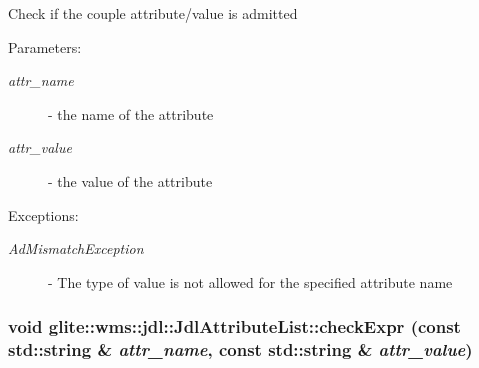 Check if the couple attribute/value is admitted \begin{Desc}
\item[Parameters:]
\begin{description}
\item[{\em attr\_\-name}]- the name of the attribute \item[{\em attr\_\-value}]- the value of the attribute \end{description}
\end{Desc}
\begin{Desc}
\item[Exceptions:]
\begin{description}
\item[{\em Ad\-Mismatch\-Exception}]- The type of value is not allowed for the specified attribute name \end{description}
\end{Desc}
\hypertarget{classglite_1_1wms_1_1jdl_1_1JdlAttributeList_z25_6}{
\subsubsection[checkExpr]{\setlength{\rightskip}{0pt plus 5cm}void glite::wms::jdl::Jdl\-Attribute\-List::check\-Expr (const std::string \& {\em attr\_\-name}, const std::string \& {\em attr\_\-value})}}
\label{classglite_1_1wms_1_1jdl_1_1JdlAttributeList_z25_6}


